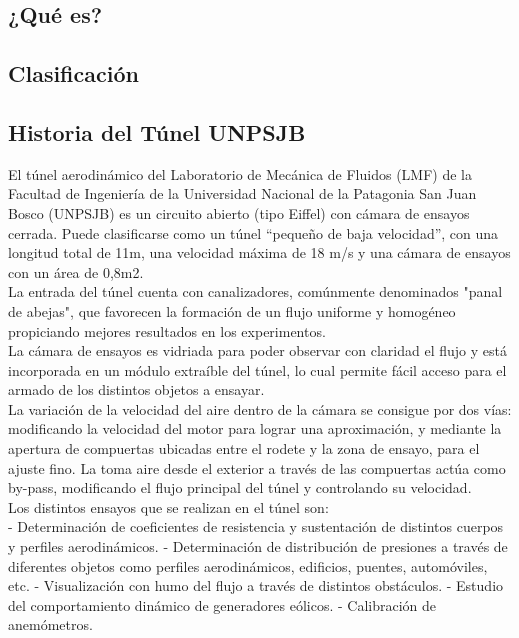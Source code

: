 \subsection{¿Qué es?}
	\subsection{Clasificación}
	\subsection{Historia del Túnel UNPSJB}
	El túnel aerodinámico del Laboratorio de Mecánica de Fluidos (LMF) de la Facultad de Ingeniería de la Universidad Nacional de la Patagonia San Juan Bosco (UNPSJB) es un circuito abierto (tipo Eiffel) con cámara de ensayos cerrada. Puede clasificarse como un túnel “pequeño de baja velocidad”, con una longitud total de 11m, una velocidad máxima de 18 m/s y una cámara de ensayos con un área de 0,8m2.
	\\
	La entrada del túnel cuenta con canalizadores, comúnmente denominados "panal de abejas", que favorecen la formación de un flujo uniforme y homogéneo propiciando mejores resultados en los experimentos.
	\\
	La cámara de ensayos es vidriada para poder observar con claridad el flujo y está incorporada en un módulo extraíble del túnel, lo cual permite fácil acceso para el armado de los distintos objetos a ensayar.
	\\
	La variación de la velocidad del aire dentro de la cámara se consigue por dos vías: modificando la velocidad del motor para lograr una aproximación, y mediante la apertura de compuertas ubicadas entre el rodete y la zona de ensayo, para el ajuste fino. La toma aire desde el exterior a través de las compuertas actúa como by-pass, modificando el flujo principal del túnel y controlando su velocidad.
	\\
	Los distintos ensayos que se realizan en el túnel son:
	\\
	- Determinación de coeficientes de resistencia y sustentación de distintos cuerpos y perfiles aerodinámicos.
	- Determinación de distribución de presiones a través de diferentes objetos como perfiles aerodinámicos, edificios, puentes, automóviles, etc.
	- Visualización con humo del flujo a través de distintos obstáculos.
	- Estudio del comportamiento dinámico de generadores eólicos.
	- Calibración de anemómetros. 